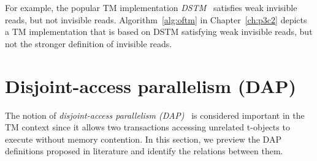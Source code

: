 For example, the popular TM implementation \emph{DSTM}~\cite{HLM+03} satisfies weak invisible reads, but not invisible reads.
Algorithm~\ref{alg:oftm} in Chapter~\ref{ch:p3c2} 
depicts a TM implementation that is based on DSTM satisfying weak invisible reads, but not
the stronger definition of invisible reads.
\section{Disjoint-access parallelism (DAP)}
\label{sec:dap}
The notion of \emph{disjoint-access parallelism (DAP)}~\cite{israeli-disjoint}
is considered important in the TM context since it allows two transactions accessing unrelated t-objects to execute
without memory contention.
In this section, we preview the DAP definitions proposed in literature and identify the relations between them.

